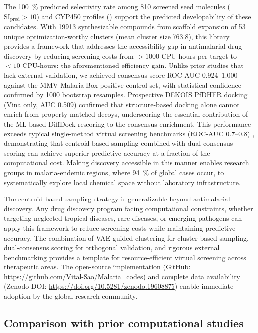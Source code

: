 \documentclass[journal=jcisd8,manuscript=article]{achemso}
\begin{document}
The \qty{100}{\percent} predicted selectivity rate among \num{810} screened seed molecules ($\text{SI}_{\text{pred}} > \num{10}$) and CYP450 profiles () support the predicted developability of these candidates. With \num{19913} synthesizable compounds from scaffold expansion of \num{53} unique optimization-worthy clusters (mean cluster size \num{763.8}), this library provides a framework that addresses the accessibility gap in antimalarial drug discovery by reducing screening costs from $>\num{1000}$ CPU-hours per target to $<\num{10}$ CPU-hours: the aforementioned efficiency gain. Unlike prior studies that lack external validation, we achieved consensus-score ROC-AUC \numrange{0.924}{1.000} against the MMV Malaria Box positive-control set, with statistical confidence confirmed by \num{1000} bootstrap resamples. Prospective DEKOIS PfDHFR docking (Vina only, AUC \num{0.509}) confirmed that structure-based docking alone cannot enrich from property-matched decoys, underscoring the essential contribution of the ML-based DiffDock rescoring to the consensus enrichment. This performance exceeds typical single-method virtual screening benchmarks (ROC-AUC \numrange{0.7}{0.8}) \cite{Truchon2007}, demonstrating that centroid-based sampling combined with dual-consensus scoring can achieve superior predictive accuracy at a fraction of the computational cost. Making discovery accessible in this manner enables research groups in malaria-endemic regions, where \qty{94}{\percent} of global cases occur, to systematically explore local chemical space without laboratory infrastructure.

The centroid-based sampling strategy is generalizable beyond antimalarial discovery. Any drug discovery program facing computational constraints, whether targeting neglected tropical diseases, rare diseases, or emerging pathogens can apply this framework to reduce screening costs while maintaining predictive accuracy. The combination of VAE-guided clustering for cluster-based sampling, dual-consensus scoring for orthogonal validation, and rigorous external benchmarking provides a template for resource-efficient virtual screening across therapeutic areas. The open-source implementation (GitHub: \url{https://github.com/Vital-Sao/Malaria_codes}) and complete data availability (Zenodo DOI: \url{https://doi.org/10.5281/zenodo.19608875}) enable immediate adoption by the global research community.

\subsection*{Comparison with prior computational studies}
\end{document}
